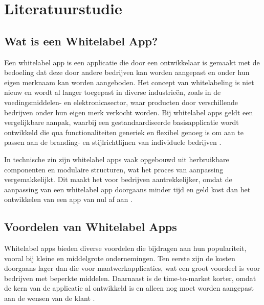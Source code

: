 
\section{Literatuurstudie}%
\label{sec:literatuurstudie}


\subsection{Wat is een Whitelabel App?}
Een whitelabel app is een applicatie die door een ontwikkelaar is gemaakt met de bedoeling dat deze door andere bedrijven kan worden aangepast en onder hun eigen merknaam kan worden aangeboden.
Het concept van whitelabeling is niet nieuw en wordt al langer toegepast in diverse industrieën, zoals in de voedingsmiddelen- en elektronicasector, waar producten door verschillende bedrijven onder hun eigen merk verkocht worden. 
Bij whitelabel apps geldt een vergelijkbare aanpak, waarbij een gestandaardiseerde basisapplicatie wordt ontwikkeld die qua functionaliteiten generiek en flexibel genoeg is om aan te passen aan de branding- en stijlrichtlijnen van individuele bedrijven \autocite{Candelario2024}.

In technische zin zijn whitelabel apps vaak opgebouwd uit herbruikbare componenten en modulaire structuren, wat het proces van aanpassing vergemakkelijkt. 
Dit maakt het voor bedrijven aantrekkelijker, omdat de aanpassing van een whitelabel app doorgaans minder tijd en geld kost dan het ontwikkelen van een app van nul af aan \autocite{Vendesta2019}.

\subsection{Voordelen van Whitelabel Apps}
Whitelabel apps bieden diverse voordelen die bijdragen aan hun populariteit, vooral bij kleine en middelgrote ondernemingen. 
Ten eerste zijn de kosten doorgaans lager dan die voor maatwerkapplicaties, wat een groot voordeel is voor bedrijven met beperkte middelen. 
Daarnaast is de time-to-market korter, omdat de kern van de applicatie al ontwikkeld is en alleen nog moet worden aangepast aan de wensen van de klant \autocite{Struk2023}.

